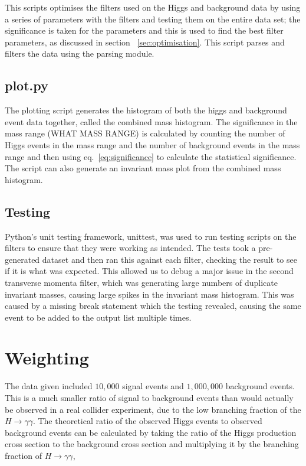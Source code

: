 \documentclass[11pt]{amsart}
\begin{document}
\begin{multicols}{2}
This scripts optimises the filters used on the Higgs and background data by using a series of parameters with the filters and testing them on the entire data set; the significance is taken for the parameters and this is used to find the best filter parameters, as discussed in section ~\ref{sec:optimisation}. This script parses and filters the data using the parsing module.

\subsection{plot.py}

The plotting script generates the histogram of both the higgs and background event data together, called the combined mass histogram. The significance in the mass range (WHAT MASS RANGE) is calculated by counting the number of Higgs events in the mass range and the number of background events in the mass range and then using eq.~\ref{eq:significance} to calculate the statistical significance. The script can also generate an invariant mass plot from the combined mass histogram.

\subsection{Testing}

Python's unit testing framework, unittest, was used to run testing scripts on the filters to ensure that they were working as intended. The tests took a pre-generated dataset and then ran this against each filter, checking the result to see if it is what was expected. This allowed us to debug a major issue in the second transverse momenta filter, which was generating large numbers of duplicate invariant masses, causing large spikes in the invariant mass histogram. This was caused by a missing break statement which the testing revealed, causing the same event to be added to the output list multiple times.

\section{Weighting}

The data given included $10,000$ signal events and $1,000,000$ background events. This is a much smaller ratio of signal to background events than would actually be observed in a real collider experiment, due to the low branching fraction of the $H \to \gamma\gamma$. The theoretical ratio of the observed Higgs events to observed background events can be calculated by taking the ratio of the Higgs production cross section to the background cross section and multiplying it by the branching fraction of $H \to \gamma\gamma$,


\end{multicols}
\end{document}
